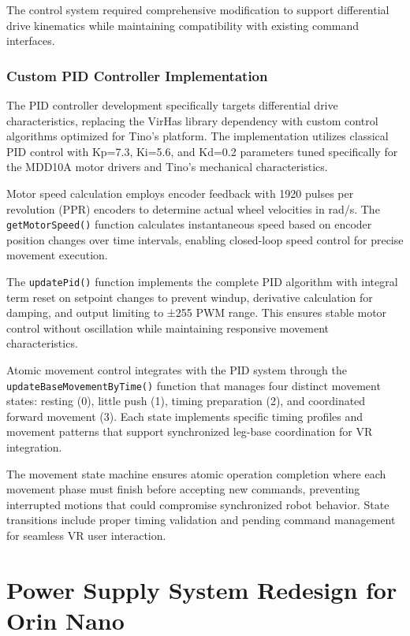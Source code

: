 The control system required comprehensive modification to support differential drive kinematics while maintaining compatibility with existing command interfaces.

\subsubsection{Custom PID Controller Implementation}

The PID controller development specifically targets differential drive characteristics, replacing the VirHas library dependency with custom control algorithms optimized for Tino's platform. The implementation utilizes classical PID control with Kp=7.3, Ki=5.6, and Kd=0.2 parameters tuned specifically for the MDD10A motor drivers and Tino's mechanical characteristics.

Motor speed calculation employs encoder feedback with 1920 pulses per revolution (PPR) encoders to determine actual wheel velocities in rad/s. The \texttt{getMotorSpeed()} function calculates instantaneous speed based on encoder position changes over time intervals, enabling closed-loop speed control for precise movement execution.

The \texttt{updatePid()} function implements the complete PID algorithm with integral term reset on setpoint changes to prevent windup, derivative calculation for damping, and output limiting to ±255 PWM range. This ensures stable motor control without oscillation while maintaining responsive movement characteristics.

Atomic movement control integrates with the PID system through the \texttt{updateBaseMovementByTime()} function that manages four distinct movement states: resting (0), little push (1), timing preparation (2), and coordinated forward movement (3). Each state implements specific timing profiles and movement patterns that support synchronized leg-base coordination for VR integration.

The movement state machine ensures atomic operation completion where each movement phase must finish before accepting new commands, preventing interrupted motions that could compromise synchronized robot behavior. State transitions include proper timing validation and pending command management for seamless VR user interaction.

\section{Power Supply System Redesign for Orin Nano}

